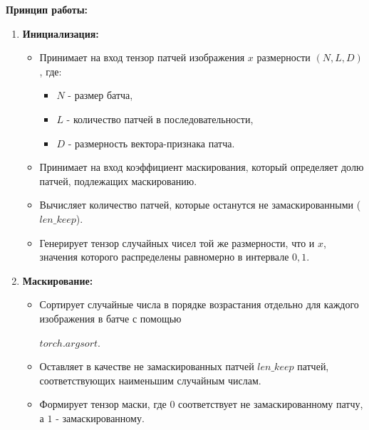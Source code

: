 \begin{itemize}
\begin{itemize}
            \textbf{Принцип работы:}
            
            \begin{enumerate}
                \item \textbf{Инициализация:}
                    \begin{itemize}
                        \item Принимает на вход тензор патчей изображения \(x\) размерности \((N, L, D)\), где: 
                            \begin{itemize}
                                \item \(N\) - размер батча,
                                \item \(L\) - количество патчей в последовательности,
                                \item \(D\) -  размерность  вектора-признака  патча.
                            \end{itemize}
                        \item  Принимает  на  вход  коэффициент  маскирования,  который  определяет  долю  патчей,  подлежащих  маскированию.
                        \item Вычисляет количество патчей, которые останутся не замаскированными  (\(len\_keep\)).
                        \item Генерирует тензор случайных чисел той же размерности, что и \(x\),  значения  которого  распределены  равномерно  в  интервале  \(0, 1\).
                    \end{itemize}
            
                \item \textbf{Маскирование:}
                    \begin{itemize}
                        \item Сортирует  случайные  числа в  порядке  возрастания  отдельно  для  каждого  изображения  в  батче  с  помощью 
                        
                        \(torch.argsort\).
                        \item Оставляет  в  качестве  не  замаскированных  патчей  \(len\_keep\)  патчей,  соответствующих  наименьшим  случайным  числам.
                        \item Формирует  тензор  маски,  где  \(0\)  соответствует  не  замаскированному  патчу,  а  \(1\)  -  замаскированному.
                    \end{itemize}
            

\end{enumerate}
\end{itemize}
\end{itemize}
